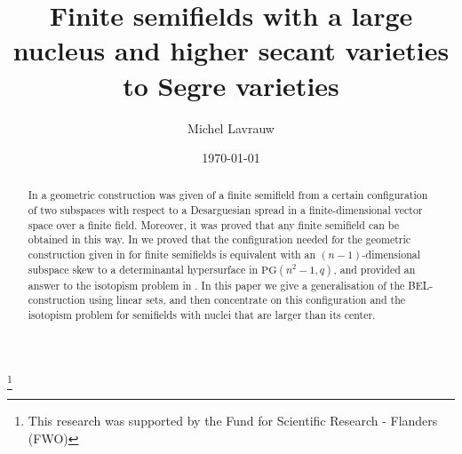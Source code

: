 \documentclass[12pt]{amsart}
\def\PG{\mathrm{PG}}
\begin{document}
\title{Finite semifields with a large nucleus and higher secant varieties to Segre varieties}
\author{Michel Lavrauw}\thanks{This research was supported by the Fund for 
Scientific Research - Flanders (FWO)}
\date{\today}
\maketitle
\begin{abstract}
In \cite{BEL} a geometric construction was given of a finite semifield from a certain configuration of two subspaces with respect to a Desarguesian spread in a finite-dimensional vector space over a finite field. Moreover, it was proved that any finite semifield can be obtained in this way.
In \cite{Lavrauw2008} we proved that the configuration needed for the geometric construction given in \cite{BEL} for finite semifields is equivalent with an $(n-1)$-dimensional subspace skew to a determinantal hypersurface in $\PG(n^2-1,q)$, and provided an answer to the isotopism problem in \cite{BEL}. In this paper we give a generalisation of the BEL-construction using linear sets, and then concentrate on this configuration and the isotopism problem for semifields with nuclei that are larger than its center.
\end{abstract}
\end{document}
